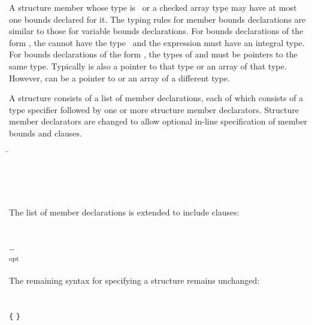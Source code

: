 A structure member whose type is \arrayptr\ or a
checked array type may have at most one bounds declared for it. The
typing rules for member bounds declarations are similar to those for
variable bounds declarations. For bounds declarations of the form
, the
 cannot have the type \arrayptrvoid\ and
the expression  must have an integral type. For bounds declarations
of the form ,
the types of  and  must be pointers to the same type.
Typically  is also  a pointer to that type or an
array of that type.  However,  can be a pointer to
or an array of a different type.

A structure consists of a list of member declarations, each of which
consists of a type specifier followed by one or more structure member
declarators. Structure member declarators are changed to allow 
optional in-line specification of member bounds and 
clauses.

\begin{tabbing}
\=\\
\>  \\
\>  \code{:}
    \\
\>  \code{:} 
 \\
\\
The list of member declarations is extended to include 
clauses:\\
\\
\\
\> \ldots{} \\
\> \textsubscript{opt}  \\
\\
The remaining syntax for specifying a structure remains unchanged: \\
\\
\\
\>  \lstinline|{|
 \lstinline|}| \\
\\
 \\
\>  \\
\>  \\
\\
 \\
\>  \code{;} \\
\\
 \\
\>  \\
\>  \code{,}  
\end{tabbing}

